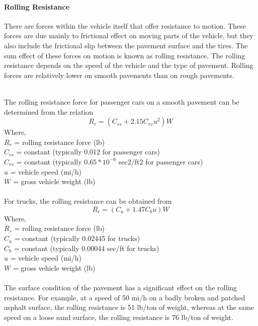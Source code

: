 \paragraph{Rolling Resistance}
There are forces within the vehicle itself that offer resistance to motion. These forces are due mainly to frictional effect on moving parts of the vehicle, but they also include the frictional slip between the pavement surface and the tires. The sum effect of these forces on motion is known as rolling resistance. The rolling resistance depends on the speed of the vehicle and the type of pavement. Rolling forces are relatively lower on smooth pavements than on rough pavements.\\\\
\par
The rolling resistance force for passenger cars on a smooth pavement can be determined from the relation
\begin{equation}
	R_r = (C_{rs} + 2.15C_{rv} u^2)W
\end{equation}
Where,\\
\hspace*{10mm}$R_r$ = rolling resistance force (lb)\\
\hspace*{10mm}$C_{rs}$ = constant (typically 0.012 for passenger cars)\\
\hspace*{10mm}$C_{rv}$ = constant (typically $0.65 * 10^{-6}$ sec2/ft2 for passenger cars)\\
\hspace*{10mm}$u$ = vehicle speed (mi/h)\\
\hspace*{10mm}$W$ = gross vehicle weight (lb)\\\\
For trucks, the rolling resistance can be obtained from
\begin{equation}
	R_r = (C_a+1.47C_b u)W
\end{equation}
Where,\\
\hspace*{10mm}$R_r$ = rolling resistance force (lb)\\
\hspace*{10mm}$C_a$ = constant (typically 0.02445 for trucks)\\
\hspace*{10mm}$C_b$ = constant (typically 0.00044 sec/ft for trucks)\\
\hspace*{10mm}$u$ = vehicle speed (mi/h)\\
\hspace*{10mm}$W$ = gross vehicle weight (lb)\\\\
The surface condition of the pavement has a significant effect on the rolling resistance. For example, at a speed of 50 mi/h on a badly broken and patched asphalt surface, the rolling resistance is 51 lb/ton of weight, whereas at the same speed on a loose sand surface, the rolling resistance is 76 lb/ton of weight.
